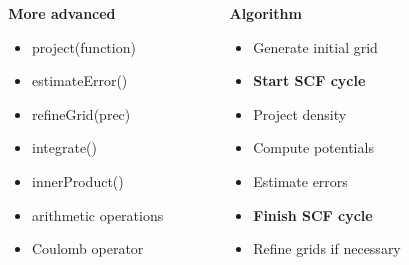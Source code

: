 \begin{frame}
    \begin{columns}
    \begin{column}{0.1\linewidth}
    \end{column}
    \begin{column}{0.4\linewidth}
    \hspace{5mm} \textbf{More advanced}
    \begin{itemize}
        \item project(function)
        \item estimateError()
        \item refineGrid(prec)
        \item integrate()
        \item innerProduct()
        \item arithmetic operations
        \item Coulomb operator
    \end{itemize}
    \end{column}
    \begin{column}{0.5\linewidth}
    \hspace{5mm} \textbf{Algorithm}
    \begin{itemize}
        \item Generate initial grid
        \item \textbf{Start SCF cycle}
        \item Project density
        \item Compute potentials
        \item Estimate errors
        \item \textbf{Finish SCF cycle}
        \item Refine grids if necessary
    \end{itemize}
    \end{column}
    \end{columns}
\end{frame}

